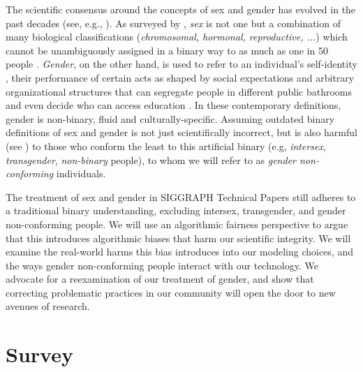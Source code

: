 \documentclass[nonacm,sigconf,review,balance=false]{acmart}
\begin{document}



The scientific consensus around the concepts of sex and gender has evolved in the past decades (see, e.g., \cite{pmid30377332}). As surveyed by \citet{fausto2012sex}, \emph{sex} is not one but a combination of many biological classifications (\emph{chromosomal, hormonal, reproductive, ...}) which cannot be unambiguously assigned in a binary way to as much as one in 50 people \cite{blackless2000sexually}.
\emph{Gender}, on the other hand, is used to refer to an individual's self-identity \cite{money1972man}, their performance of certain acts as shaped by social expectations \cite{butler2003gender} and arbitrary organizational structures that can segregate people in different public bathrooms and even decide who can access education \cite{lorber1994paradoxes}. In these contemporary definitions, gender is non-binary, fluid and culturally-specific. Assuming outdated binary definitions of sex and gender is not just scientifically incorrect, but is also harmful (see \cite{un2015report}) to those who conform the least to this artificial binary (e.g, \emph{intersex}, \emph{transgender}, \emph{non-binary} people), to whom we will refer to as \emph{gender non-conforming} individuals.

The treatment of sex and gender in SIGGRAPH Technical Papers
still adheres to a traditional binary understanding, excluding intersex, transgender, and
gender non-conforming people. We will use an algorithmic fairness perspective to argue that this introduces algorithmic biases that harm our scientific integrity.
We will examine the real-world harms this bias introduces into our modeling
choices, and the ways gender non-conforming people interact with
our technology. We advocate for a reexamination of our treatment of gender, and show that correcting problematic practices in
our community will open the door to new avenues of research.

\vspace{-0.1cm}
\section{Survey}

\end{document}
